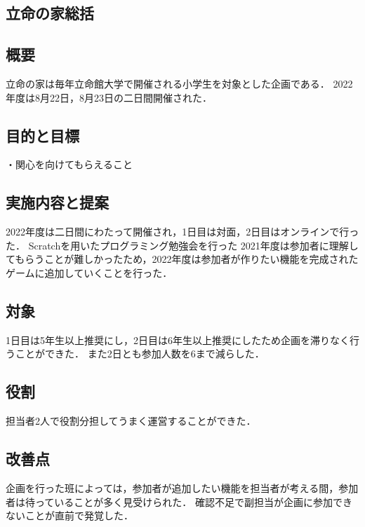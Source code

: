\subsection*{立命の家総括}


\subsection*{概要}
立命の家は毎年立命館大学で開催される小学生を対象とした企画である．
2022年度は8月22日，8月23日の二日間開催された．

\subsection*{目的と目標}
\begin{itemize}
    ・関心を向けてもらえること
\end{itemize}
\subsection*{実施内容と提案}
2022年度は二日間にわたって開催され，1日目は対面，2日目はオンラインで行った．
Scratchを用いたプログラミング勉強会を行った
2021年度は参加者に理解してもらうことが難しかったため，2022年度は参加者が作りたい機能を完成されたゲームに追加していくことを行った．

\subsection*{対象}
1日目は5年生以上推奨にし，2日目は6年生以上推奨にしたため企画を滞りなく行うことができた．
また2日とも参加人数を6まで減らした．

\subsection*{役割}
担当者2人で役割分担してうまく運営することができた．

\subsection*{改善点}
企画を行った班によっては，参加者が追加したい機能を担当者が考える間，参加者は待っていることが多く見受けられた．
確認不足で副担当が企画に参加できないことが直前で発覚した．
